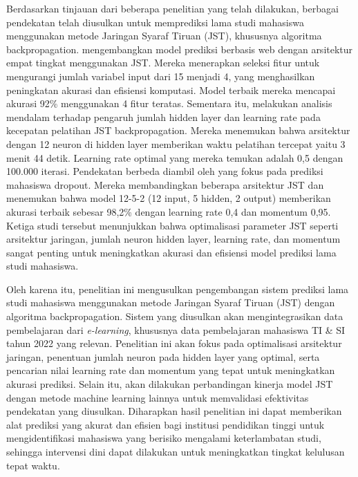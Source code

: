 Berdasarkan tinjauan dari beberapa penelitian yang telah dilakukan, berbagai pendekatan telah diusulkan untuk memprediksi lama studi mahasiswa menggunakan metode Jaringan Syaraf Tiruan (JST), khususnya algoritma backpropagation. \cite{hossen2021web} mengembangkan model prediksi berbasis web dengan arsitektur empat tingkat menggunakan JST. Mereka menerapkan seleksi fitur untuk mengurangi jumlah variabel input dari 15 menjadi 4, yang menghasilkan peningkatan akurasi dan efisiensi komputasi. Model terbaik mereka mencapai akurasi 92\% menggunakan 4 fitur teratas. Sementara itu, \cite{sunardi2022pengaruh} melakukan analisis mendalam terhadap pengaruh jumlah hidden layer dan learning rate pada kecepatan pelatihan JST backpropagation. Mereka menemukan bahwa arsitektur dengan 12 neuron di hidden layer memberikan waktu pelatihan tercepat yaitu 3 menit 44 detik. Learning rate optimal yang mereka temukan adalah 0,5 dengan 100.000 iterasi. Pendekatan berbeda diambil oleh \cite{sari2021analisis} yang fokus pada prediksi mahasiswa dropout. Mereka membandingkan beberapa arsitektur JST dan menemukan bahwa model 12-5-2 (12 input, 5 hidden, 2 output) memberikan akurasi terbaik sebesar 98,2\% dengan learning rate 0,4 dan momentum 0,95. Ketiga studi tersebut menunjukkan bahwa optimalisasi parameter JST seperti arsitektur jaringan, jumlah neuron hidden layer, learning rate, dan momentum sangat penting untuk meningkatkan akurasi dan efisiensi model prediksi lama studi mahasiswa.

Oleh karena itu, penelitian ini mengusulkan pengembangan sistem prediksi lama studi mahasiswa menggunakan metode Jaringan Syaraf Tiruan (JST) dengan algoritma backpropagation. Sistem yang diusulkan akan mengintegrasikan data pembelajaran dari \textit{e-learning}, khususnya data pembelajaran mahasiswa TI \& SI tahun 2022 yang relevan. Penelitian ini akan fokus pada optimalisasi arsitektur jaringan, penentuan jumlah neuron pada hidden layer yang optimal, serta pencarian nilai learning rate dan momentum yang tepat untuk meningkatkan akurasi prediksi. Selain itu, akan dilakukan perbandingan kinerja model JST dengan metode machine learning lainnya untuk memvalidasi efektivitas pendekatan yang diusulkan. Diharapkan hasil penelitian ini dapat memberikan alat prediksi yang akurat dan efisien bagi institusi pendidikan tinggi untuk mengidentifikasi mahasiswa yang berisiko mengalami keterlambatan studi, sehingga intervensi dini dapat dilakukan untuk meningkatkan tingkat kelulusan tepat waktu.

